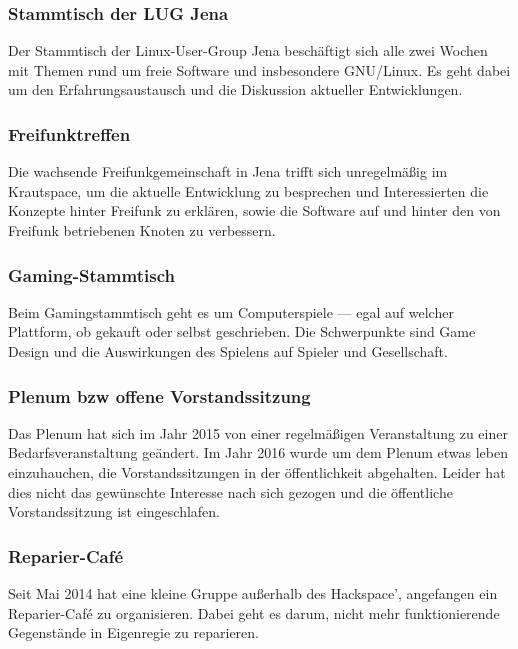\documentclass[ngerman]{scrartcl}
\begin{document}
\subsubsection{Stammtisch der LUG Jena}

Der Stammtisch der Linux-User-Group Jena beschäftigt sich alle zwei
Wochen mit Themen rund um freie Software und insbesondere
GNU/Linux. Es geht dabei um den Erfahrungsaustausch und die Diskussion
aktueller Entwicklungen.

\subsubsection{Freifunktreffen}

Die wachsende Freifunkgemeinschaft in Jena trifft sich unregelmäßig im
Krautspace, um die aktuelle Entwicklung zu besprechen und
Interessierten die Konzepte hinter Freifunk zu erklären, sowie die
Software auf und hinter den von Freifunk betriebenen Knoten zu
verbessern.

\subsubsection{Gaming-Stammtisch}

Beim Gamingstammtisch geht es um Computerspiele — egal auf welcher
Plattform, ob gekauft oder selbst geschrieben. Die Schwerpunkte sind
Game Design und die Auswirkungen des Spielens auf Spieler und
Gesellschaft.

\subsubsection{Plenum bzw offene Vorstandssitzung}

Das Plenum hat sich im Jahr 2015 von einer regelmäßigen Veranstaltung
zu einer Bedarfsveranstaltung geändert. Im Jahr 2016 wurde um dem
Plenum etwas leben einzuhauchen, die Vorstandssitzungen in der
öffentlichkeit abgehalten. Leider hat dies nicht das gewünschte
Interesse nach sich gezogen und die öffentliche Vorstandssitzung ist
eingeschlafen.

\subsubsection{Reparier-Café}

Seit Mai 2014 hat eine kleine Gruppe außerhalb des Hackspace',
angefangen ein Reparier-Café zu organisieren. Dabei geht es darum,
nicht mehr funktionierende Gegenstände in Eigenregie zu reparieren.
\end{document}
